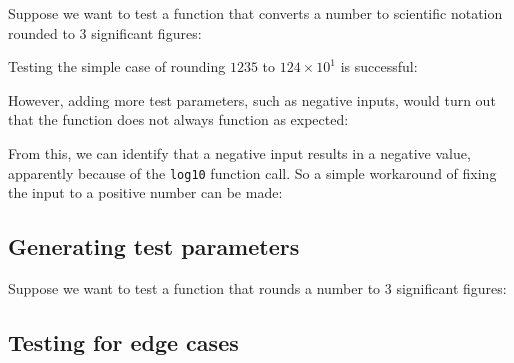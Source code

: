 Suppose we want to test a function that converts a number to scientific notation rounded to 3 significant figures:


Testing the simple case of rounding $1235$ to $124\times10^1$ is successful:


However, adding more test parameters, such as negative inputs, would turn out that the function does not always function as expected:


From this, we can identify that a negative input results in a negative value, apparently because of the \texttt{log10} function call.
So a simple workaround of fixing the input to a positive number can be made:


\subsection{Generating test parameters}
Suppose we want to test a function that rounds a number to 3 significant figures:


\subsection{Testing for edge cases}
